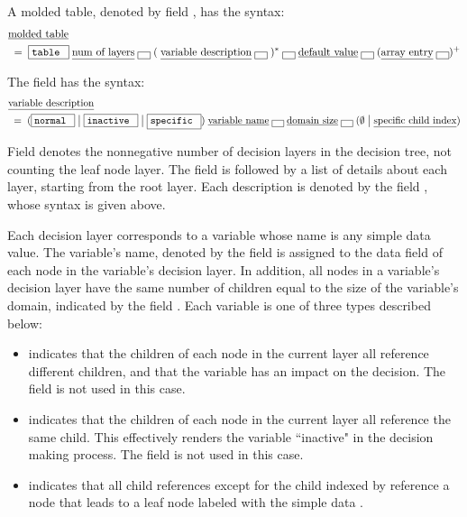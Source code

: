 \documentclass{article}
\newcommand{\literal}[1]{\fbox{\texttt{#1}}}
\newcommand{\sor}{\;\big|\;}
\begin{document}
A molded table, denoted by field \underline{}, has the syntax:
\begin{align*}
& \underline{\text{molded table}} \\
& \;=\;\literal{table }\;\underline{\text{num of layers}}\;\literal{~}\;(\;\underline{\text{variable description}}\;\literal{~}\;)^*\;\literal{~}\;\underline{\text{default value}}\;\literal{~}\;(\underline{\text{array entry}}\;\literal{~})^+
\end{align*}

The field \underline{} has the syntax: 
\begin{align*}
& \underline{\text{variable description}} \\
& \;=\; (\literal{normal }\sor\literal{inactive }\sor\literal{specific })\;\underline{\text{variable name}}\;\literal{~}\;\underline{\text{domain size}}\;\literal{~}\;(\emptyset\sor\underline{\text{specific child index}})
\end{align*}

Field \underline{} denotes the nonnegative number of decision layers in the decision tree, not counting the leaf node layer. The \underline{} field is followed by a list of details about each layer, starting from the root layer. Each description is denoted by the field \underline{}, whose syntax is given above.

Each decision layer corresponds to a variable whose name is any simple data value. The variable's name, denoted by the field \underline{} is assigned to the data field of each node in the variable's decision layer. In addition, all nodes in a variable's decision layer have the same number of children equal to the size of the variable's domain, indicated by the field \underline{}. Each variable is one of three types described below: 
\begin{itemize}
\item \literal{normal } indicates that the children of each node in the current layer all reference different children, and that the variable has an impact on the decision. The field \underline{} is not used in this case.
\item \literal{inactive } indicates that the children of each node in the current layer all reference the same child. This effectively renders the variable ``inactive" in the decision making process. The field \underline{} is not used in this case.
\item \literal{specific } indicates that all child references except for the child indexed by \underline{} reference a node that leads to a leaf node labeled with the simple data \underline{}.
\end{itemize}
\end{document}
